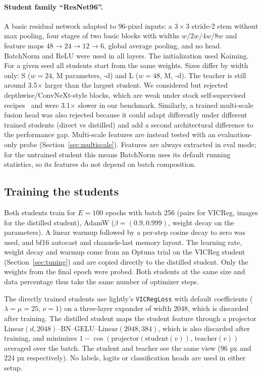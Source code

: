 \documentclass[letterpaper,11pt]{article}
\begin{document}
\paragraph{Student family ``ResNet96''.} A basic residual network adapted to
96-pixel inputs: a $3\times3$ stride-2 stem without max pooling, four stages of two basic
blocks with widths $w$/$2w$/$4w$/$8w$ and feature maps $48\to24\to12\to6$, global average
pooling, and no head. BatchNorm and ReLU were used in all layers. The initialization used Kaiming. For a given seed all students start from the same weights. Sizes differ by width only: S ($w=24$, \ParamsS{}M
parameters, \FeatDimS-d) and L ($w=48$, \ParamsL{}M, \FeatDimL-d). The teacher is still around 3.5$\times$ larger than the largest student. We considered but rejected depthwise/ConvNeXt-style blocks, which are
weak under stock self-supervised recipes~\citep[Table~1]{fang2021seed} and were 3.1$\times$ slower in our benchmark. Similarly, a
trained multi-scale fusion head was also rejected because it could adapt differently under different trained students (direct vs distilled) and add a
second architectural difference to the performance gap. Multi-scale features are instead tested with an evaluation-only probe (Section~\ref{sec:multiscale}). Features are always extracted in eval mode; for the untrained student this means BatchNorm uses its default running statistics,
so its features do not depend on batch composition.

\subsection{Training the students}
\label{sec:training}

Both students train for $E=100$ epochs with batch 256 (pairs for VICReg, images for the distilled student), AdamW
($\beta=(0.9,0.999)$, weight decay on the parameters). A linear warmup followed by a per-step
cosine decay to zero was used, and bf16 autocast and channels-last memory layout. The learning rate,
weight decay and warmup come from an Optuna trial on the VICReg student (Section~\ref{sec:tuning}) and are
copied directly to the distilled student. Only the weights from the final epoch were probed. Both students at the same size and data percentage thus take the same number of optimizer steps.

The directly trained students use lightly's \texttt{VICRegLoss} with default coefficients
($\lambda=\mu=25$, $\nu=1$) on a three-layer expander of width 2048, which is discarded after
training. The distilled student maps the student feature through a projector
$\mathrm{Linear}(d,2048)$--BN--GELU--$\mathrm{Linear}(2048,384)$, which is also discarded after training,
and minimizes $1-\cos(\text{projector}(\text{student}(v)),\,\text{teacher}(v))$ averaged over
the batch. The student and teacher see the same view (96 px and 224 px respectively).
No labels, logits or classification heads are used in either setup.
\end{document}
